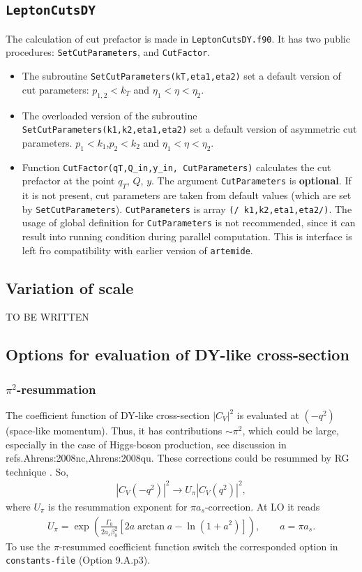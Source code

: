 \documentclass[prd,nofootinbib,eqsecnum,final]{revtex4}
\renewcommand{\(}{\left(}
\renewcommand{\)}{\right)}
\renewcommand{\[}{\left[}
\renewcommand{\]}{\right]}
\begin{document}
\subsection{\texttt{LeptonCutsDY}}

The calculation of cut prefactor is made in \texttt{LeptonCutsDY.f90}. It has two public procedures: \texttt{SetCutParameters}, and \texttt{CutFactor}. 
\begin{itemize}
\item The subroutine \texttt{SetCutParameters(kT,eta1,eta2)} set a default version of cut parameters: $p_{1,2}<k_T$ and $\eta_1<\eta<\eta_2$.
\item The overloaded version of the subroutine \texttt{SetCutParameters(k1,k2,eta1,eta2)} set a default version of asymmetric cut parameters. $p_{1}<k_1$,$p_2<k_2$ and $\eta_1<\eta<\eta_2$.
\item Function \texttt{CutFactor(qT,Q\_in,y\_in, CutParameters)} calculates the cut prefactor at the point $q_T$, $Q$, $y$. The argument \texttt{CutParameters} is \textbf{optional}. If it is not present, cut parameters are taken from default values (which are set by \texttt{SetCutParameters}). \texttt{CutParameters} is array \texttt{(/ k1,k2,eta1,eta2/)}. The usage of global definition for \texttt{CutParameters} is not recommended, since it can result into running condition during parallel computation. This is interface is left fro compatibility with earlier version of \texttt{artemide}.
\end{itemize} 

\subsection{Variation of scale}
\label{TMDX:c2}

TO BE WRITTEN

\subsection{Options for evaluation of DY-like cross-section}

\subsubsection{$\pi^2$-resummation}

The coefficient function of DY-like cross-section $|C_V|^2$ is evaluated at $(-q^2)$ (space-like momentum). Thus, it has contributions $\sim \pi^2$, which could be large, especially in the case of Higgs-boson production, see discussion in  refs.{Ahrens:2008nc,Ahrens:2008qu}. These corrections could be resummed by RG technique \cite{Ahrens:2008qu}. So,
\begin{eqnarray}
|C_V(-q^2)|^2\to U_\pi |C_V(q^2)|^2,
\end{eqnarray}
where $U_\pi$ is the resummation exponent for $\pi a_s$-correction. At LO it reads \cite{Ahrens:2008qu}
\begin{eqnarray}
U_\pi=\exp\(\frac{\Gamma_0}{2a_s\beta_0^2}[2 a \arctan a-\ln(1+a^2)]\),\qquad a=\pi a_s.
\end{eqnarray}
To use the $\pi$-resummed coefficient function switch the corresponded option in \texttt{constants-file} (Option 9.A.p3).
\end{document}
